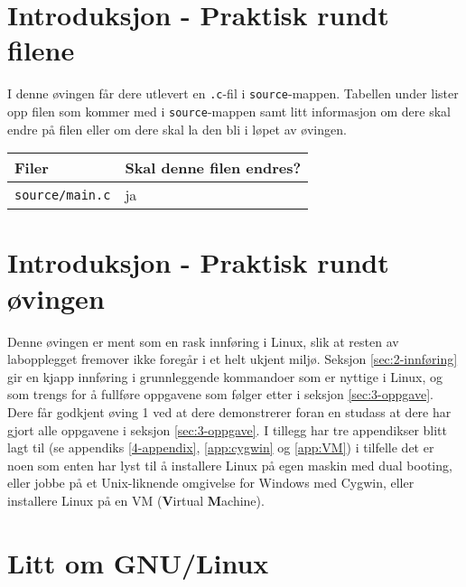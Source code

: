 \begin{alphasection}
\section{Introduksjon - Praktisk rundt filene}

I denne øvingen får dere utlevert en \verb|.c|-fil i \verb|source|-mappen. Tabellen under lister opp filen som kommer med i \verb|source|-mappen samt litt informasjon om dere skal endre på filen eller om dere skal la den bli i løpet av øvingen.

\begin{center}
 \begin{tabular}{|p{8.5cm} p{5.5cm}|} 
 \hline
 \textbf{Filer} & \textbf{Skal denne filen endres?}  \\ [0.5ex] 
 \hline\hline
  \verb|source/main.c| & ja  \\ 
 \hline
\end{tabular}
\end{center}

\section{Introduksjon - Praktisk rundt øvingen}



Denne øvingen er ment som en rask innføring i Linux, slik  at resten av labopplegget fremover ikke foregår i et helt ukjent miljø. Seksjon \ref{sec:2-innføring} gir en kjapp innføring i grunnleggende kommandoer som er nyttige i Linux, og som trengs for å fullføre oppgavene som følger etter i seksjon \ref{sec:3-oppgave}. Dere får godkjent øving 1 ved at dere demonstrerer foran en studass at dere har gjort alle oppgavene i seksjon \ref{sec:3-oppgave}. 
I tillegg har tre appendikser blitt lagt til (se appendiks \ref{4-appendix}, \ref{app:cygwin} og \ref{app:VM}) i tilfelle det er noen som enten har lyst til å installere Linux på egen maskin med dual booting, eller jobbe på et Unix-liknende omgivelse for Windows med Cygwin, eller installere Linux på en VM (\textbf{V}irtual \textbf{M}achine).



\section{Litt om GNU/Linux}


\end{alphasection}
